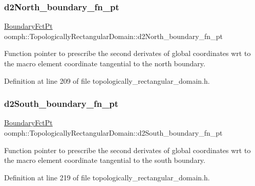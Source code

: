 \subsubsection{\texorpdfstring{d2\+North\+\_\+boundary\+\_\+fn\+\_\+pt}{d2North\_boundary\_fn\_pt}}
{\footnotesize\ttfamily \hyperlink{classoomph_1_1TopologicallyRectangularDomain_a8b2e24f5500d86c93aef509c5410e7cc}{Boundary\+Fct\+Pt} oomph\+::\+Topologically\+Rectangular\+Domain\+::d2\+North\+\_\+boundary\+\_\+fn\+\_\+pt\hspace{0.3cm}{\ttfamily [private]}}



Function pointer to prescribe the second derivates of global coordinates wrt to the macro element coordinate tangential to the north boundary. 



Definition at line 209 of file topologically\+\_\+rectangular\+\_\+domain.\+h.

\mbox{\label{classoomph_1_1TopologicallyRectangularDomain_a71020e52d5dd8cc0be51b9b466a294dc}} 
\subsubsection{\texorpdfstring{d2\+South\+\_\+boundary\+\_\+fn\+\_\+pt}{d2South\_boundary\_fn\_pt}}
{\footnotesize\ttfamily \hyperlink{classoomph_1_1TopologicallyRectangularDomain_a8b2e24f5500d86c93aef509c5410e7cc}{Boundary\+Fct\+Pt} oomph\+::\+Topologically\+Rectangular\+Domain\+::d2\+South\+\_\+boundary\+\_\+fn\+\_\+pt\hspace{0.3cm}{\ttfamily [private]}}



Function pointer to prescribe the second derivates of global coordinates wrt to the macro element coordinate tangential to the south boundary. 



Definition at line 219 of file topologically\+\_\+rectangular\+\_\+domain.\+h.

\mbox{\label{classoomph_1_1TopologicallyRectangularDomain_a55aaf2cfce3da535d9dd9ac5e990be3b}} 
